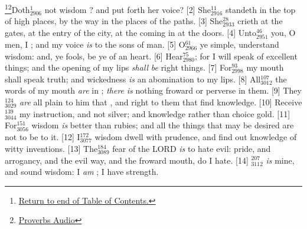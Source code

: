 \footnote{\textcolor[cmyk]{0.99998,1,0,0}{\hyperlink{TOC}{Return to end of Table of Contents.}}}\footnote{\href{https://audiobible.com/bible/bible.html}{\textcolor[cmyk]{0.99998,1,0,0}{Proverbs Audio}}}\textcolor[cmyk]{0.99998,1,0,0}{Doth\textcolor{jungle}{$_{2906}^{1}$} not wisdom ? and  put forth her voice?}
[2] \textcolor[cmyk]{0.99998,1,0,0}{She\textcolor{jungle}{$_{2916}^{11}$} standeth in the top of high places, by the way in the places of the paths.}
[3] \textcolor[cmyk]{0.99998,1,0,0}{She\textcolor{jungle}{$_{2933}^{28}$} crieth at the gates, at the entry of the city, at the coming in at the doors.}
[4] \textcolor[cmyk]{0.99998,1,0,0}{Unto\textcolor{jungle}{$_{2951}^{46}$} you, O men, I ; and my voice \emph{is} to the sons of man.}
[5] \textcolor[cmyk]{0.99998,1,0,0}{O\textcolor{jungle}{$_{2966}^{61}$} ye simple, understand wisdom: and, ye fools, be ye of an  heart.}
[6] \textcolor[cmyk]{0.99998,1,0,0}{Hear\textcolor{jungle}{$_{2980}^{75}$}; for I will speak of excellent things; and the opening of my lips \emph{shall} \emph{be} right things.}
[7] \textcolor[cmyk]{0.99998,1,0,0}{For\textcolor{jungle}{$_{2998}^{93}$} my mouth shall speak truth; and wickedness \emph{is} an abomination to my lips.}
[8] \textcolor[cmyk]{0.99998,1,0,0}{All\textcolor{jungle}{$_{3012}^{107}$} the words of my mouth \emph{are} in ; \emph{there} \emph{is} nothing froward or perverse in them.}
[9] \textcolor[cmyk]{0.99998,1,0,0}{They\textcolor{jungle}{$_{3029}^{124}$} \emph{are} all plain to him that , and right to them that find knowledge.}
[10] \textcolor[cmyk]{0.99998,1,0,0}{Receive\textcolor{jungle}{$_{3044}^{139}$} my instruction, and not silver; and knowledge rather than choice gold.}
[11] \textcolor[cmyk]{0.99998,1,0,0}{For\textcolor{jungle}{$_{3056}^{151}$} wisdom \emph{is} better than rubies; and all the things that may be desired are not to be  to it.}
[12] \textcolor[cmyk]{0.99998,1,0,0}{I\textcolor{jungle}{$_{3077}^{172}$} wisdom dwell with prudence, and find out knowledge of witty inventions.}
[13] \textcolor[cmyk]{0.99998,1,0,0}{The\textcolor{jungle}{$_{3089}^{184}$} fear of the LORD \emph{is} to hate evil: pride, and arrogancy, and the evil way, and the froward mouth, do I hate.}
[14] \textcolor[cmyk]{0.99998,1,0,0}{\textcolor{jungle}{$_{3112}^{207}$} \emph{is} mine, and sound wisdom: I \emph{am} ; I have strength.}
